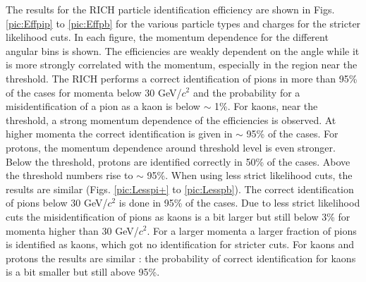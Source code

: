 The results for the RICH particle identification efficiency are shown in Figs. \ref{pic:Effpip} to \ref{pic:Effpb} for the various particle types and charges for the stricter likelihood cuts. In each figure, the momentum dependence for the different angular bins is shown. The efficiencies are weakly dependent on the angle while it is more strongly correlated with the momentum, especially in the region near the threshold.
The RICH performs a correct identification of pions in more than 95\% of the cases for momenta below 30 GeV/$c^2$ and the probability for a misidentification of a pion as a kaon is below $\sim$ 1\%. For kaons, near the threshold, a strong momentum dependence of the efficiencies is observed. At higher momenta the correct identification is given in $\sim$ 95\% of the cases. For protons, the momentum dependence around threshold level is even stronger. Below the threshold, protons are identified correctly in 50\% of the cases. Above the threshold numbers rise to $\sim$ 95\%. When using less strict likelihood cuts, the results are similar (Figs. \ref{pic:Lesspi+} to \ref{pic:Lesspb}). The correct identification of pions below 30 GeV/$c^2$ is done in 95\% of the cases. Due to less strict likelihood cuts the misidentification of pions as kaons is a bit larger but still below 3\% for momenta higher than 30 GeV/$c^2$. For a larger momenta a larger fraction of pions is identified as kaons, which got no identification for stricter cuts. For kaons and protons the results are similar : the probability of correct identification for kaons is a bit smaller but still above 95\%.

